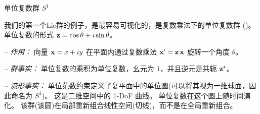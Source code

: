 

\begin{fexample}	{单位复数群 $S^1$}
\label{ex:S1}

我们的第一个Lie群的例子，是最容易可视化的，是复数乘法下的单位复数群 ()。
单位复数的形式 ${\bf z}=\cos\theta+i\sin\theta$。

\emph{-- 作用：}
向量 ${\bf x}=x+iy$ 在平面内通过复数乘法 ${\bf x}'={\bf z}\,{\bf x}$ 旋转一个角度 $\theta$。

\emph{-- 群事实：}
单位复数的乘积为单位复数，幺元为 $1$，并且逆元是共轭 ${\bf z}^*$。

\emph{-- 流形事实：} 
单位范数约束定义了复平面中的单位圆(可以将其视为一维球面，因此命名为 $S^1$)。
这是二维空间中的 1-DoF 曲线。 
单位复数在这个圆上随时间演化。
该群(该圆)在局部重新组合线性空间(切线)，而不是在全局重新组合。
\end{fexample}
